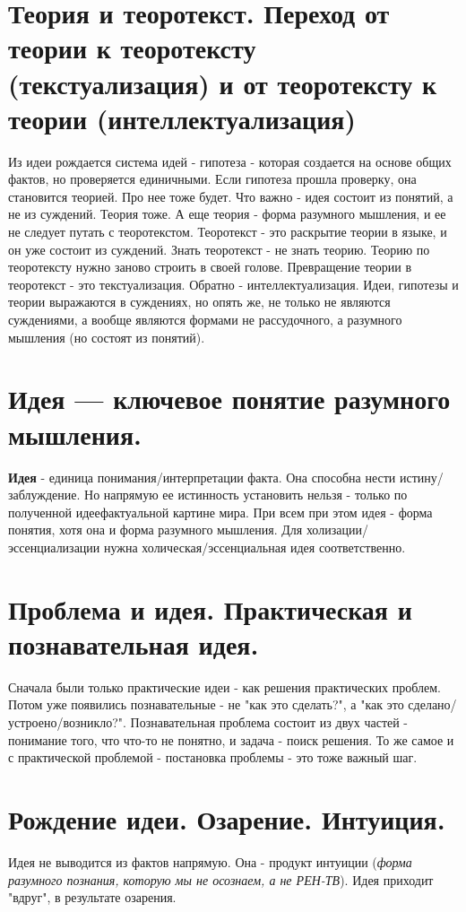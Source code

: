 \section{ Теория и теоротекст. Переход от теории к теоротексту (текстуализация) и от теоротексту к теории (интеллектуализация)}
Из идеи рождается система идей - гипотеза - которая создается на основе общих фактов, но проверяется единичными. Если гипотеза прошла проверку, она становится теорией. Про нее тоже будет. Что важно - идея состоит из понятий, а не из суждений. Теория тоже. А еще теория - форма разумного мышления, и ее не следует путать с теоротекстом. Теоротекст - это раскрытие теории в языке, и он уже состоит из суждений. Знать теоротекст - не знать теорию. Теорию по теоротексту нужно заново строить в своей голове. Превращение теории в теоротекст - это текстуализация. Обратно - интеллектуализация. Идеи, гипотезы и теории выражаются в суждениях, но опять же, не только не являются суждениями, а вообще являются формами не рассудочного, а разумного мышления (но состоят из понятий).

\section{ Идея — ключевое понятие разумного мышления.}
\textbf{Идея} - единица понимания/интерпретации факта. Она способна нести истину/заблуждение. Но напрямую ее истинность установить нельзя - только по полученной идеефактуальной картине мира. При всем при этом идея - форма понятия, хотя она и форма разумного мышления. Для холизации/эссенциализации нужна холическая/эссенциальная идея соответственно.

\section{ Проблема и идея. Практическая и познавательная идея.}
Сначала были только практические идеи - как решения практических проблем. Потом уже появились познавательные - не "как это сделать?", а "как это сделано/устроено/возникло?". Познавательная проблема состоит из двух частей - понимание того, что что-то не понятно, и задача - поиск решения. То же самое и с практической проблемой - постановка проблемы - это тоже важный шаг.

\section{ Рождение идеи. Озарение. Интуиция.}
Идея не выводится из фактов напрямую. Она - продукт интуиции (\textit{форма разумного познания, которую мы не осознаем, а не РЕН-ТВ}). Идея приходит "вдруг", в результате озарения. 

